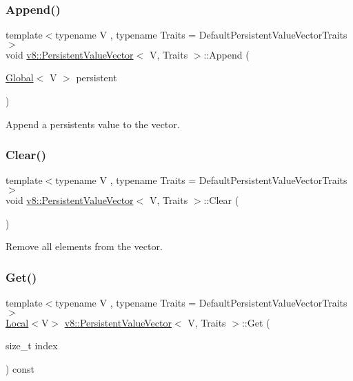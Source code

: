 \subsubsection{\texorpdfstring{Append()}{Append()}\hspace{0.1cm}{\footnotesize\ttfamily [2/2]}}
{\footnotesize\ttfamily template$<$typename V , typename Traits  = Default\+Persistent\+Value\+Vector\+Traits$>$ \\
void \mbox{\hyperlink{classv8_1_1PersistentValueVector}{v8\+::\+Persistent\+Value\+Vector}}$<$ V, Traits $>$\+::Append (\begin{DoxyParamCaption}\item[{\mbox{\hyperlink{classv8_1_1Global}{Global}}$<$ V $>$}]{persistent }\end{DoxyParamCaption})\hspace{0.3cm}{\ttfamily [inline]}}

Append a persistent\textquotesingle{}s value to the vector. \mbox{\label{classv8_1_1PersistentValueVector_ad07f449c2004b4f3d91e58cabde99a53}} 
\subsubsection{\texorpdfstring{Clear()}{Clear()}}
{\footnotesize\ttfamily template$<$typename V , typename Traits  = Default\+Persistent\+Value\+Vector\+Traits$>$ \\
void \mbox{\hyperlink{classv8_1_1PersistentValueVector}{v8\+::\+Persistent\+Value\+Vector}}$<$ V, Traits $>$\+::Clear (\begin{DoxyParamCaption}{ }\end{DoxyParamCaption})\hspace{0.3cm}{\ttfamily [inline]}}

Remove all elements from the vector. \mbox{\label{classv8_1_1PersistentValueVector_a0788f334c7f61355863244379042ce76}} 
\subsubsection{\texorpdfstring{Get()}{Get()}}
{\footnotesize\ttfamily template$<$typename V , typename Traits  = Default\+Persistent\+Value\+Vector\+Traits$>$ \\
\mbox{\hyperlink{classv8_1_1Local}{Local}}$<$V$>$ \mbox{\hyperlink{classv8_1_1PersistentValueVector}{v8\+::\+Persistent\+Value\+Vector}}$<$ V, Traits $>$\+::Get (\begin{DoxyParamCaption}\item[{size\+\_\+t}]{index }\end{DoxyParamCaption}) const\hspace{0.3cm}{\ttfamily [inline]}}

